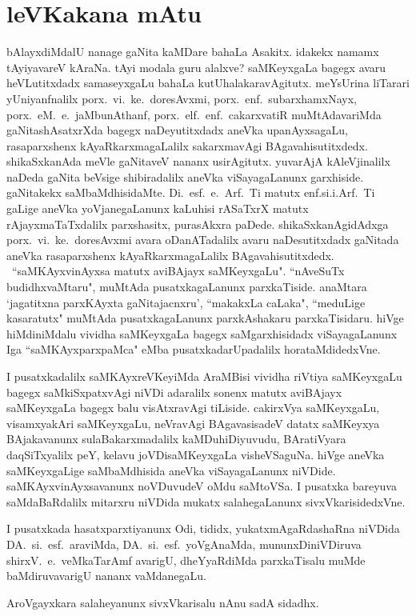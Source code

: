 \chapter*{leVKakana mAtu}
\vskip -20pt

bAlayxdiMdalU nanage gaNita kaMDare bahaLa Asakitx. idakekx namamx tAyiyavareV kAraNa. tAyi modala 
guru alalxve? saMKeyxgaLa bagegx avaru heVLutitxdadx samaseyxgaLu bahaLa kutUhalakaravAgitutx. 
meYsUrina liTarari yUniyanfnalilx porx.\ vi.~ke.\ doresAvxmi, porx.\ enf.\ subarxhamxNayx, 
porx.\ eM.\ e.\ jaMbunAthanf, porx.\ elf.~enf.~cakarxvatiR muMtAdavariMda gaNitashAsatxrXda bagegx    naDeyutitxdadx aneVka upanAyxsagaLu, rasaparxshenx kAyaR\-karxmagaLalilx sakarxmavAgi BAgavahisutitxdedx. shikaSxkanAda meVle gaNitaveV nananx usirAgitutx. yuvarAjA kAleVjinalilx naDeda gaNita beVsige shibiradalilx aneVka viSayagaLanunx garxhiside. gaNitakekx saMbaMdhisidaMte. Di.\ esf.\ e.\ Arf.\ 
Ti matutx enf.si.i.Arf.~Ti gaLige aneVka yoVjanegaLanunx kaLuhisi rASaTxrX matutx rAjayxmaTaTxdalilx parxshasitx, purasAkxra paDede. shikaSxkanAgidAdxga porx.~vi.~ke.\ doresAvxmi avara oDanATadalilx avaru naDesutitxdadx gaNitada aneVka rasaparxshenx kAyaRkarxmagaLalilx BAgavahisutitxdedx. ~``saMKAyxvinAyxsa matutx aviBAjayx saMKeyxgaLu". ``nAveSuTx \-budidhxvaMtaru", muMtAda pusatxkagaLanunx parxkaTiside. anaMtara `jagatitxna parxKAyxta gaNitajacnxru', ``makakxLa caLaka", ``meduLige kasaratutx" muMtAda pusatxkagaLanunx parxkAshakaru parxkaTisidaru. hiVge hiMdiniMdalu vividha saMKeyxgaLa bagegx saMgarxhisidadx viSayagaLanunx Iga ``saMKAyxparxpaMca" eMba pusatxkadarUpadalilx horataMdidedxVne. 

I pusatxkadalilx saMKAyxreVKeyiMda AraMBisi vividha riVtiya saMKeyxgaLu bagegx saMkiSxpatxvAgi niVDi adaralilx sonenx matutx aviBAjayx saMKeyxgaLa bagegx balu visAtxravAgi tiLiside. cakirxVya saMKeyxgaLu, visamxyakAri saMKeyxgaLu, neVravAgi BAgavasisadeV datatx saMKeyxya BAjakavanunx sulaBakarxmadalilx kaMDuhiDiyuvudu, BAratiVyara daqSiTxyalilx peY, kelavu joVDisaMKeyxgaLa visheVSaguNa. hiVge aneVka saMKeyxgaLige saMbaMdhisida aneVka viSayagaLanunx niVDide. saMKAyxvinAyxsavanunx noVDuvudeV oMdu saMtoVSa. I pusatxka bareyuva saMdaBaRdalilx mitarxru niVDida mukatx salahegaLanunx sivxVkarisidedxVne.

I pusatxkada hasatxparxtiyanunx Odi, tididx, yukatxmAgaRdashaRna niVDida DA.\-\ si.~esf.\ araviMda, DA.~si.~esf.\ yoVgAnaMda, mununxDiniVDiruva shirxV.~e.\ veMkaTarAmf avarigU, dheYyaRdiMda parxkaTisalu muMde baMdiruvavarigU nananx vaMdanegaLu.

AroVgayxkara salaheyanunx sivxVkarisalu nAnu sadA sidadhx.
